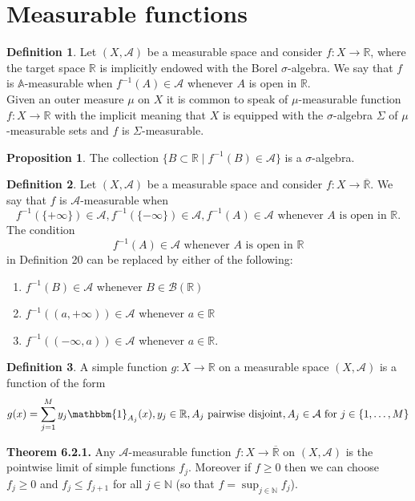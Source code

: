 \documentclass[a4paper,14pt]{extarticle}
\theoremstyle{definition}
\newtheorem{definition}{Definition}
\newtheorem{proposition}{Proposition}
\begin{document}
\section{Measurable functions}
\begin{definition}
  Let $(X,\mathcal{A})$ be a measurable space and consider $f:X\rightarrow\mathbb{R}$, where the target space $\mathbb{R}$ is implicitly endowed with the Borel $\sigma$-algebra. We say that $f$ is $\mathbb{A}$-measurable when $f^{-1}(A)\in\mathcal{A}$ whenever $A$ is open in $\mathbb{R}$. \\

  Given an outer measure $\mu$ on $X$ it is common to speak of $\mu$-measurable function $f:X\rightarrow\mathbb{R}$ with the implicit meaning that $X$ is equipped with the $\sigma$-algebra $\Sigma$ of $\mu$-measurable sets and $f$ is $\Sigma$-measurable.
\end{definition}
\begin{proposition}
  The collection $\{B\subset\mathbb{R}\mid f^{-1}(B)\in\mathcal{A}\}$ is a $\sigma$-algebra.
\end{proposition}
\begin{definition}
  Let $(X,\mathcal{A})$ be a measurable space and consider $f:X\rightarrow\overline{\mathbb{R}}$. We say that $f$ is $\mathcal{A}$-measurable when 
  \[f^{-1}(\{+\infty\})\in\mathcal{A}, f^{-1}(\{-\infty\})\in\mathcal{A}, f^{-1}(A)\in\mathcal{A}\text{ whenever $A$ is open in $\mathbb{R}$.}\]
  The condition \[f^{-1}(A)\in\mathcal{A}\text{ whenever $A$ is open in $\mathbb{R}$}\] in Definition 20 can be replaced by either of the following:
  \begin{enumerate}
    \item $f^{-1}(B)\in\mathcal{A}$ whenever $B\in\mathcal{B}(\mathbb{R})$
    \item $f^{-1}((a,+\infty))\in\mathcal{A}$ whenever $a\in\mathbb{R}$
    \item $f^{-1}((-\infty,a))\in\mathcal{A}$ whenever $a\in\mathbb{R}$.
  \end{enumerate}
\end{definition}
\begin{definition}
  A simple function $g:X\rightarrow\mathbb{R}$ on a measurable space $(X,\mathcal{A})$ is a function of the form 
  \[g(x)=\sum_{j=1}^M y_j\mathbbm{1}_{A_j}(x), y_j\in\mathbb{R}, A_j\text{ pairwise disjoint}, A_j\in\mathcal{A}\text{ for }j\in\{1,\ldots,M\}\]
\end{definition}
\noindent\textbf{Theorem 6.2.1.} Any $\mathcal{A}$-measurable function $f:X\rightarrow\overline{\mathbb{R}}$ on $(X,\mathcal{A})$ is the pointwise limit of simple functions $f_j$. Moreover if $f\geq0$ then we can choose $f_j\geq0$ and $f_j\leq f_{j+1}$ for all $j\in\mathbb{N}$ (so that $f=\sup_{j\in\mathbb{N}}f_j$). \\
\end{document}
